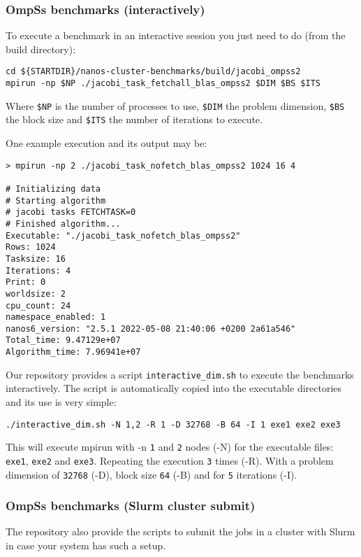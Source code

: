 \documentclass{article}
\newcommand{\code}[1]{\texttt{#1}}
\begin{document}
\subsubsection{OmpSs benchmarks (interactively)}
To execute a benchmark in an interactive session you just need to do
(from the build directory):

\begin{lstlisting}
cd ${STARTDIR}/nanos-cluster-benchmarks/build/jacobi_ompss2
mpirun -np $NP ./jacobi_task_fetchall_blas_ompss2 $DIM $BS $ITS
\end{lstlisting}

Where \code{\$NP} is the number of processes to use, \code{\$DIM} the
problem dimension, \code{\$BS} the block size and \code{\$ITS} the
number of iterations to execute.

One example execution and its output may be:
\begin{lstlisting}
> mpirun -np 2 ./jacobi_task_nofetch_blas_ompss2 1024 16 4

# Initializing data
# Starting algorithm
# jacobi tasks FETCHTASK=0
# Finished algorithm...
Executable: "./jacobi_task_nofetch_blas_ompss2"
Rows: 1024
Tasksize: 16
Iterations: 4
Print: 0
worldsize: 2
cpu_count: 24
namespace_enabled: 1
nanos6_version: "2.5.1 2022-05-08 21:40:06 +0200 2a61a546"
Total_time: 9.47129e+07
Algorithm_time: 7.96941e+07
\end{lstlisting}

Our repository provides a script \code{interactive\_dim.sh} to execute
the benchmarks interactively. The script is automatically copied into
the executable directories and its use is very simple:

\begin{lstlisting}
./interactive_dim.sh -N 1,2 -R 1 -D 32768 -B 64 -I 1 exe1 exe2 exe3
\end{lstlisting}

This will execute mpirun with -n \code{1} and \code{2} nodes (-N) for
the executable files: \code{exe1}, \code{exe2} and
\code{exe3}. Repeating the execution \code{3} times (-R). With a
problem dimension of \code{32768} (-D), block size \code{64} (-B) and
for \code{5} iterations (-I).


\subsubsection{OmpSs benchmarks (Slurm cluster submit)}

The repository also provide the scripts to submit the jobs in a
cluster with Slurm in case your system has such a setup.
\end{document}
